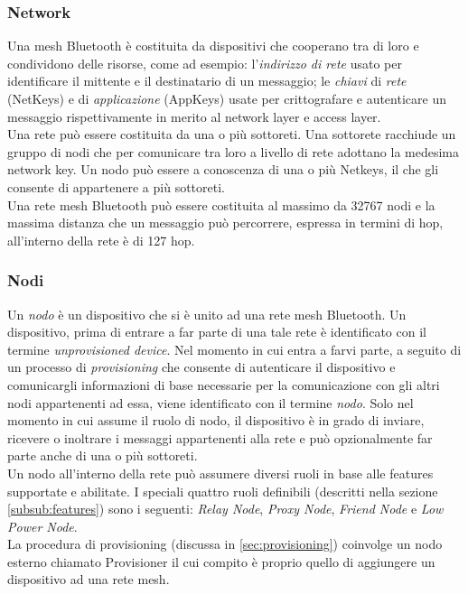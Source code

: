 \subsubsection{Network}
\label{subsub:network}
Una mesh Bluetooth è costituita da dispositivi che cooperano tra di loro e condividono delle risorse, come ad esempio: 
l'\textit{indirizzo di rete} usato per identificare il mittente e il destinatario di un messaggio; %
le \textit{chiavi} di \textit{rete} (NetKeys) e di \textit{applicazione} (AppKeys) usate per crittografare e autenticare un messaggio rispettivamente in merito al network layer e access layer.\\ %
Una rete può essere costituita da una o più sottoreti. Una sottorete racchiude un gruppo di nodi che per comunicare tra loro a livello di rete adottano la medesima network key. Un nodo può essere a conoscenza di una o più Netkeys, il che gli consente di appartenere a più sottoreti.\\
Una rete mesh Bluetooth può essere costituita al massimo da 32767 nodi e la massima distanza che un messaggio può percorrere, espressa in termini di hop, all'interno della rete è di 127 hop.

\subsubsection{Nodi}
\label{subsub:nodi}
Un \textit{nodo} è un dispositivo che si è unito ad una rete mesh Bluetooth. Un dispositivo, prima di entrare a far parte di una tale rete è identificato con il termine \textit{unprovisioned device}. Nel momento in cui entra a farvi parte, a seguito di un processo di \textit{provisioning} che consente di autenticare il dispositivo e comunicargli informazioni di base necessarie per la comunicazione con gli altri nodi appartenenti ad essa, viene identificato con il termine \textit{nodo}. Solo nel momento in cui assume il ruolo di nodo, il dispositivo è in grado di inviare, ricevere o inoltrare i messaggi appartenenti alla rete e può opzionalmente far parte anche di una o più sottoreti.\\
Un nodo all'interno della rete può assumere diversi ruoli in base alle features supportate e abilitate. I speciali quattro ruoli definibili (descritti nella sezione \ref{subsub:features}) sono i seguenti: \textit{Relay Node}, \textit{Proxy Node}, \textit{Friend Node} e \textit{Low Power Node}. \\
La procedura di provisioning (discussa in \ref{sec:provisioning}) coinvolge un nodo esterno chiamato Provisioner il cui compito è proprio quello di aggiungere un dispositivo ad una rete mesh.

